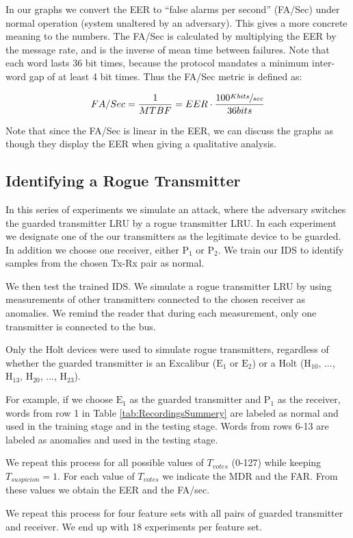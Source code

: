 \documentclass[compsoc,conference,a4paper,10pt,times]{IEEEtran}
\newcommand{\sublevel}[1]{\subsection{#1}}
\newcommand{\sublevel}[1]{\section{#1}}
\begin{document}
  In our graphs we convert the EER to ``false alarms per second'' (FA/Sec) under normal operation (system unaltered by an adversary). This gives a more concrete meaning to the numbers. The FA/Sec is calculated by multiplying the EER by the message rate, and is the inverse of mean time between failures. Note that each word lasts 36 bit times, because the protocol mandates a minimum inter-word gap of at least 4 bit times. Thus the FA/Sec metric is defined as:
  
  \[FA/Sec = \frac{1}{MTBF} = EER \cdot \frac{100 \sfrac{Kbits}{sec}}{36bits}\]
  
  Note that since the FA/Sec is linear in the EER, we can discuss the graphs as though they display the EER when giving a qualitative analysis.
  
\sublevel{Identifying a Rogue Transmitter}
  In this series of experiments we simulate an attack, where the adversary switches the guarded transmitter LRU by a rogue transmitter LRU. In each experiment we designate one of the our transmitters as the legitimate device to be guarded. In addition we choose one receiver, either \(\text{P}_1\) or \(\text{P}_2\).  We train our IDS to identify samples from the chosen Tx-Rx pair as normal.
  
  We then test the trained IDS. We simulate a rogue transmitter LRU by using measurements of other transmitters connected to the chosen receiver as anomalies. We remind the reader that during each measurement, only one transmitter is connected to the bus.
  
  Only the Holt devices were used to simulate rogue transmitters, regardless of whether the guarded transmitter is an Excalibur (\(\text{E}_1\) or \(\text{E}_2\)) or a Holt (\(\text{H}_{10}\), ..., \(\text{H}_{13}\), \(\text{H}_{20}\), ..., \(\text{H}_{23}\)).
  
  For example, if we choose \(\text{E}_1\) as the guarded transmitter and \(\text{P}_1\) as the receiver, words from row 1 in Table \ref{tab:RecordingsSummery} are labeled as normal and used in the training stage and in the testing stage. Words from rows 6-13 are labeled as anomalies and used in the testing stage.
  
  We repeat this process for all possible values of $T_{votes}$ (0-127) while keeping $T_{suspicion} = 1$. For each value of $T_{votes}$ we indicate the MDR and the FAR. From these values we obtain the EER and the FA/sec.
  
  We repeat this process for four feature sets with all pairs of guarded transmitter and receiver. We end up with 18 experiments per feature set.
  
\end{document}
